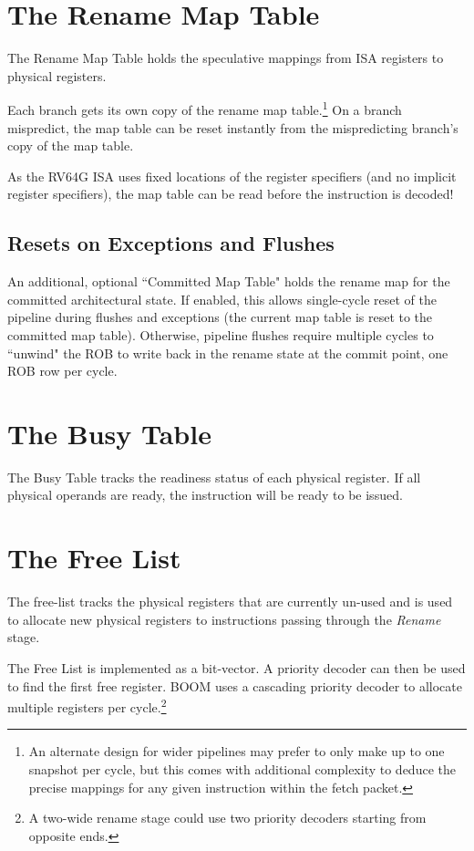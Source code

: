 \section{The Rename Map Table}

The Rename Map Table holds the speculative mappings from ISA registers to physical registers.  

Each branch gets its own copy of the rename map table.\footnote{An alternate design for wider pipelines may prefer to only make up to one snapshot per cycle, but this comes with additional complexity to deduce the precise mappings for any given instruction within the fetch packet.}  On a branch mispredict, the map table can be reset instantly from the mispredicting branch's copy of the map table. 

As the RV64G ISA uses fixed locations of the register specifiers (and no implicit register specifiers), the map table can be read before the instruction is decoded!  

\subsection{Resets on Exceptions and Flushes}


An additional, optional ``Committed Map Table" holds the rename map for the committed architectural state.  If enabled, this allows single-cycle reset of the pipeline during flushes and exceptions (the current map table is reset to the committed map table). Otherwise, pipeline flushes require multiple cycles to ``unwind" the ROB to write back in the rename state at the commit point, one ROB row per cycle.


\section{The Busy Table}

The Busy Table tracks the readiness status of each physical register. If all physical operands are ready, the instruction will be ready to be issued. 

\section{The Free List}

The free-list tracks the physical registers that are currently un-used and is used to allocate new physical registers to instructions passing through the {\em Rename} stage.  

The Free List is implemented as a bit-vector.  A priority decoder can then be used to find the first free register. BOOM uses a cascading priority decoder to allocate multiple registers per cycle.\footnote{A two-wide rename stage could use two priority decoders starting from opposite ends.}

